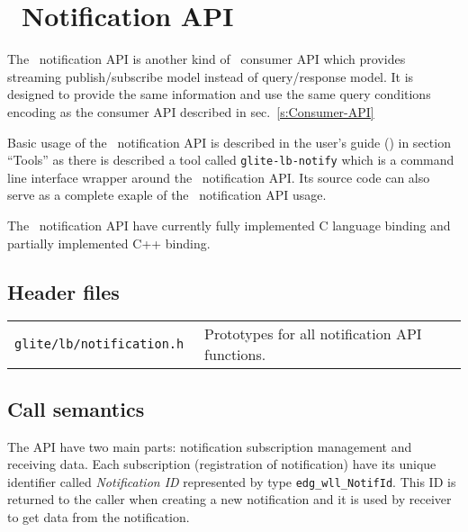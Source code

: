 %
%

\section{\LB\ Notification API}
\label{s:Notification-API}

The \LB\ notification API is another kind of \LB\ consumer API which
provides streaming publish/subscribe model instead of query/response
model. It is designed to provide the same information and use the same
query conditions encoding as the consumer API described in
sec.~\ref{s:Consumer-API}

Basic usage of the \LB\ notification API is described in the \LB
user's guide (\cite{lbug}) in section ``Tools'' as there is described
a tool called \verb'glite-lb-notify' which is a command line interface
wrapper around the \LB\ notification API. Its source code can also
serve as a complete exaple of the \LB\ notification API usage.

The \LB\ notification API have currently fully implemented C language
binding and partially implemented C++ binding.

\subsection{Header files}
\begin{table}[h]
\begin{tabularx}{\textwidth}{>{\tt}lX}
glite/lb/notification.h & Prototypes for all notification API functions. \\
\end{tabularx}
\end{table}

\subsection{Call semantics}
The API have two main parts: notification subscription management and
receiving data. Each subscription (registration of notification) have
its unique identifier called \emph{Notification ID} represented by
type \verb'edg_wll_NotifId'. This ID is returned to the caller when
creating a new notification and it is used by receiver to get data
from the notification.

